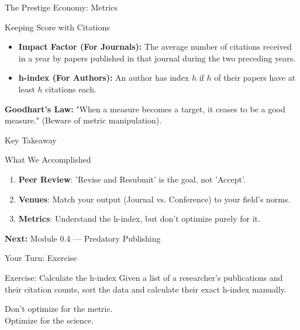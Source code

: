 \documentclass[aspectratio=169]{beamer}
\begin{document}
\begin{frame}{The Prestige Economy: Metrics}
  \begin{exampleblock}{Keeping Score with Citations}
    \begin{itemize}
      \item \textbf{Impact Factor (For Journals):} The average number of citations received in a year by papers published in that journal during the two preceding years.
      \item \textbf{h-index (For Authors):} An author has index $h$ if $h$ of their papers have at least $h$ citations each.
    \end{itemize}
  \end{exampleblock}
  \vspace{0.3cm}
  \textbf{Goodhart's Law:} "When a measure becomes a target, it ceases to be a good measure." (Beware of metric manipulation).
\end{frame}

\begin{frame}{Key Takeaway}
  \begin{block}{What We Accomplished}
    \begin{enumerate}
      \item \textbf{Peer Review}: 'Revise and Resubmit' is the goal, not 'Accept'.
      \item \textbf{Venues}: Match your output (Journal vs. Conference) to your field's norms.
      \item \textbf{Metrics}: Understand the h-index, but don't optimize purely for it.
    \end{enumerate}
  \end{block}
  \vspace{0.3cm}
  \textbf{Next:} Module 0.4 --- Predatory Publishing
\end{frame}

\begin{frame}{Your Turn: Exercise}
  \begin{exampleblock}{Exercise: Calculate the h-index}
    Given a list of a researcher's publications and their citation counts, sort the data and calculate their exact h-index manually.
  \end{exampleblock}
\end{frame}

\begin{frame}[standout]
  Don't optimize for the metric.\\
  Optimize for the science.
\end{frame}
\end{document}
